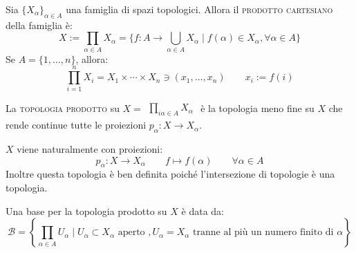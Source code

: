 \documentclass{article}
\begin{document}
\begin{defn}
	Sia $\{X_\alpha\}_{\alpha \in A}$ una famiglia di spazi topologici. Allora il \textsc{prodotto cartesiano} della famiglia è:
	$$X:=\prod_{\alpha \in A} X_\alpha = \{f:A \longrightarrow \bigcup _{\alpha \in A} X_\alpha  \mid f(\alpha)\in X_\alpha, \forall \alpha \in A\} $$
	Se $A=\{1, \dots ,n\}$, allora:
	$$\prod_{i=1}^n X_i=X_1 \times \cdots \times X_n \ni (x_1, \dots ,x_n) \qquad x_i:=f(i)$$
\end{defn}
\begin{defn}
	La \textsc{topologia prodotto} su $X=\begin{matrix} \prod_{i\alpha \in A} X_\alpha \end{matrix}	$ è la topologia meno fine su $X$ che 			rende continue tutte le proiezioni $p_\alpha : X \longrightarrow X_\alpha$.
\end{defn}
\begin{oss}
	$X$ viene naturalmente con proiezioni:
	$$p_\alpha :X \longrightarrow X_\alpha \qquad f \longmapsto f(\alpha) \qquad \forall \alpha \in A$$
	Inoltre questa topologia è ben definita poiché l'intersezione di topologie è una topologia.
\end{oss}
\begin{prop}
	Una base per la topologia prodotto su $X$ è data da:
	$$\mathcal{B}=\left \{\prod_{\alpha \in A} U_\alpha \mid U_\alpha \subset X_\alpha \text{ aperto }, U_\alpha =X_\alpha \text{ tranne al più 		un numero finito di }\alpha \right \}$$
\end{prop}
\end{document}
